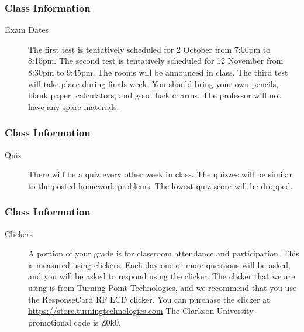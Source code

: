 \begin{frame}
  \frametitle{Class Information}

\begin{description}
\item[Exam Dates] The first test is tentatively scheduled for 2
  October from 7:00pm to 8:15pm. The second test is tentatively
  scheduled for 12 November from 8:30pm to 9:45pm. The rooms will be
  announced in class. The third test will take place during finals
  week.  You should bring your own pencils, blank paper, calculators,
  and good luck charms.  The professor will not have any spare
  materials.
 
\end{description}

\end{frame}

\begin{frame}
  \frametitle{Class Information}

\begin{description}
\item[Quiz] There will be a quiz every other week in class. The
  quizzes will be similar to the posted homework problems. The lowest
  quiz score will be dropped.
\end{description}

\end{frame}


\begin{frame}
  \frametitle{Class Information}

\begin{description}
  \item[Clickers] A portion of your grade is for classroom attendance
    and participation. This is measured using clickers. Each day one
    or more questions will be asked, and you will be asked to respond
    using the clicker. The clicker that we are using is from Turning
    Point Technologies, and we recommend that you use the ResponseCard
    RF LCD clicker. You can purchase the clicker at
    \url{https://store.turningtechnologies.com} The Clarkson
    University promotional code is Z0k0.

\end{description}

\end{frame}

